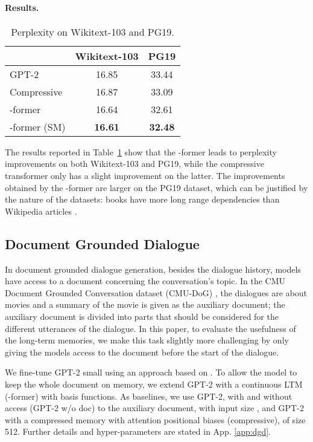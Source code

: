 \documentclass[11pt]{article}
\begin{document}
\paragraph{Results. }
\begin{table}[t]
\centering \small
\setlength{\tabcolsep}{3.5ex}
\begin{tabular}{lcc}
\toprule
& Wikitext-103 & PG19 \\
\midrule
GPT-2 & 16.85 & 33.44 \\
Compressive & 16.87 & 33.09 \\
-former & 16.64 & 32.61 \\
-former (SM) & \textbf{16.61} & \textbf{32.48} \\
\bottomrule
\end{tabular}
\caption{Perplexity on Wikitext-103 and PG19.} 
\label{table:gpt2}
\end{table}

The results reported in Table~\ref{table:gpt2} show that the \mbox{-former} leads to perplexity improvements 
on both Wikitext-103 and PG19, while the compressive transformer only has a slight improvement on the latter. 
The improvements obtained by the \mbox{-former} are larger on the PG19 dataset, which can be justified by the nature of the datasets: books have more long range dependencies than Wikipedia articles \citep{rae2019compressive}.




\subsection{Document Grounded Dialogue}
\label{sec:dgg}
In document grounded dialogue generation, besides the dialogue history, models have access to a document concerning the conversation's topic. In the CMU Document Grounded Conversation dataset (CMU-DoG) \citep{zhou2018dataset}, the dialogues are about movies and a summary of the movie is given as the auxiliary document; the auxiliary document is divided into parts that should be considered for the different utterances of the dialogue. In this paper, to evaluate the usefulness of the long-term memories, we make this task slightly more challenging by only giving the models access to the document before the start of the dialogue.

We fine-tune \mbox{GPT-2} small \citep{radford2019language} using an approach based on \citet{wolf2019transfertransfo}. To allow the model to keep the whole document on memory, we extend GPT-2 with a continuous LTM (-former) with  basis functions.
As baselines, we use GPT-2, with and without access (GPT-2 w/o doc) to the auxiliary document, with  input size , and GPT-2 with a compressed memory with attention positional biases (compressive), of size 512. Further details and hyper-parameters are stated in App. \ref{app:dgd}. 
\end{document}
